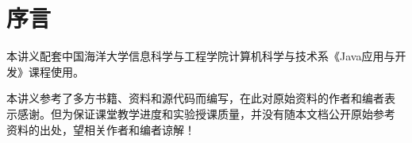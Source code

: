 \documentclass[12pt,leqno]{report}
\newcommand{\hei}{\CJKfamily{SimHei}}
\begin{document}
\clearpage{}


\tableofcontents 
\newpage
\listoffigures %
\listoftables %
\chapter*{序\quad 言}

\pagestyle{plain}

本讲义配套中国海洋大学信息科学与工程学院计算机科学与技术系《Java应用与开
发》课程使用。

本讲义参考了多方书籍、资料和源代码而编写，在此对原始资料的作者和编者表
示感谢。但为保证课堂教学进度和实验授课质量，并没有随本文档公开原始参考
资料的出处，望相关作者和编者谅解！


\pagestyle{headings}
\clearpage{}

\pagestyle{fancy}
\rhead{\chaptername}
\cfoot{\sc}



































%





\end{document}
